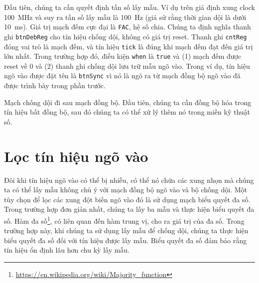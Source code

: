\documentclass[%
    10pt,
    headinclude, footexclude,
    openright, %
    notitlepage,
    cleardoubleempty,
    headsepline,
    pointlessnumbers,
    bibtotoc, idxtotoc,
    ]{scrbook}
\newcommand{\code}[1]{{\small{\texttt{#1}}}}
\newcommand{\myref}[2]{\href{#1}{#2}}
\renewcommand{\myref}[2]{{#2}{\footnote{\url{#1}}}}
\begin{document}

Đầu tiên, chúng ta cần quyết định tần số lấy mẫu. Ví dụ trên giả định xung clock 100~MHz và suy ra tần số lấy mẫu là 100~Hz (giả sử rằng thời gian dội là dưới 10~ms). Giá trị mạch đếm cực đại là \code{FAC}, hệ số chia. Chúng ta định nghĩa thanh ghi \code{btnDebReg} cho tín hiệu chống dội, không có giá trị reset. Thanh ghi \code{cntReg} đóng vai trò là mạch đếm, và tín hiệu \code{tick} là đúng khi mạch đếm đạt đến giá trị lớn nhất. Trong trường hợp đó, điều kiện \code{when} là \code{true} và (1) mạch đếm được reset về 0 và (2) thanh ghi chống dội lưu trữ mẫu ngõ vào. Trong ví dụ, tín hiệu ngõ vào được đặt tên là \code{btnSync} vì nó là ngõ ra từ mạch đồng bộ ngõ vào đã được trình bày trong phần trước.

Mạch chống dội đi sau mạch đồng bộ. Đầu tiên, chúng ta cần đồng bộ hóa trong tín hiệu bất đồng bộ, sau đó chúng ta có thể xử lý thêm nó trong miền kỹ thuật số. 

\section{Lọc tín hiệu ngõ vào}


Đôi khi tín hiệu ngõ vào có thể bị nhiễu, có thể nó chứa các xung nhọn mà chúng ta có thể lấy mẫu không chủ ý với mạch đồng bộ ngõ vào và bộ chống dội. Một tùy chọn để lọc các xung đột biến ngõ vào đó là sử dụng mạch biểu quyết đa số. Trong trường hợp đơn giản nhất, chúng ta lấy ba mẫu và thực hiện biểu quyết đa số. \myref{https://en.wikipedia.org/wiki/Majority_function}{Hàm đa số}, có liên quan đến hàm trung vị, cho ra giá trị của đa số. Trong trường hợp này, khi chúng ta sử dụng lấy mẫu để chống dội, chúng ta thực hiện biểu quyết đa số đối với tín hiệu được lấy mẫu. Biểu quyết đa số đảm bảo rằng tín hiệu ổn định lâu hơn chu kỳ lấy mẫu. 
\end{document}
